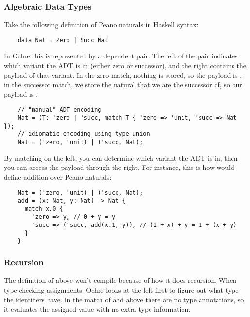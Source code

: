\documentclass[12pt,twoside]{report}
\begin{document}
\subsubsection{Algebraic Data Types}
Take the following definition of Peano naturals in Haskell syntax:

  \begin{verbatim}
    data Nat = Zero | Succ Nat
  \end{verbatim}

In Ochre this is represented by a dependent pair. The left of the pair indicates which variant the ADT is in (either zero or successor), and the right contains the payload of that variant. In the zero match, nothing is stored, so the payload is , in the successor match, we store the natural that we are the successor of, so our payload is .

  \begin{verbatim}
    // "manual" ADT encoding
    Nat = (T: 'zero | 'succ, match T { 'zero => 'unit, 'succ => Nat });
    // idiomatic encoding using type union
    Nat = ('zero, 'unit) | ('succ, Nat);
  \end{verbatim}

By matching on the left, you can determine which variant the ADT is in, then you can access the payload through the right. For instance, this is how would define addition over Peano naturals:

  \begin{verbatim}
    Nat = ('zero, 'unit) | ('succ, Nat);
    add = (x: Nat, y: Nat) -> Nat {
      match x.0 {
        'zero => y, // 0 + y = y
        'succ => ('succ, add(x.1, y)), // (1 + x) + y = 1 + (x + y)
      }
    }
  \end{verbatim}

\subsubsection{Recursion}
The definition of  above won't compile because of how it does recursion. When type-checking assignments, Ochre looks at the left first to figure out what type the identifiers have. In the match of  and  above there are no type annotations, so it evaluates the assigned value with no extra type information.
\end{document}
